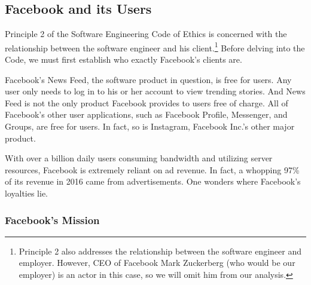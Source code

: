 
\subsection{Facebook and its Users}

\par Principle 2 of the Software Engineering Code of Ethics is concerned with the relationship between the software engineer and his client.\footnote{Principle 2 also addresses the relationship between the software engineer and employer. However, CEO of Facebook Mark Zuckerberg (who would be our employer) is an actor in this case, so we will omit him from our analysis.} \cite{se_code} Before delving into the Code, we must first establish who exactly Facebook's clients are.
\par Facebook's News Feed, the software product in question, is free for users. Any user only needs to log in to his or her account to view trending stories. And News Feed is not the only product Facebook provides to users free of charge. All of Facebook's other user applications, such as Facebook Profile, Messenger, and Groups, are free for users. In fact, so is Instagram, Facebook Inc.'s other major product. \cite{fb_newsroom}
\par With over a billion daily users consuming bandwidth and utilizing server resources, Facebook is extremely reliant on ad revenue. In fact, a whopping 97\% of its revenue in 2016 came from advertisements. \cite{fb_4q2016} One wonders where Facebook's loyalties lie.

\subsubsection{Facebook's Mission}
\label{mission}

